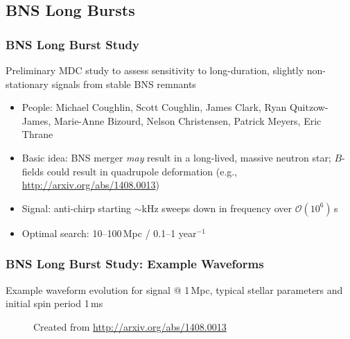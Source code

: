 \documentclass{beamer}
\begin{document}
\subsection{BNS Long Bursts}
\begin{frame}
    \frametitle{BNS Long Burst Study}
    Preliminary MDC study to assess sensitivity to long-duration, slightly
    non-stationary signals from stable BNS remnants
    \begin{itemize}
        \item People: Michael Coughlin, Scott Coughlin, James Clark, Ryan
            Quitzow-James, Marie-Anne Bizourd, Nelson Christensen, Patrick
            Meyers, Eric Thrane
        \item Basic idea: BNS merger \emph{may} result in a long-lived, massive
            neutron star; $B$-fields could result in quadrupole deformation
            (e.g., \url{http://arxiv.org/abs/1408.0013})
        \item Signal: anti-chirp starting $\sim$kHz sweeps down in frequency
            over $\mathcal{O}(10^6)$\,s
        \item Optimal search: 10--100\,Mpc / 0.1--1 year$^{-1}$
    \end{itemize}
\end{frame}

\begin{frame}
    \frametitle{BNS Long Burst Study: Example Waveforms}
    Example waveform evolution for signal @ 1\,Mpc, typical stellar parameters
    and initial spin period 1\,ms

    \begin{figure}
        \centering
        \caption{Created from \url{http://arxiv.org/abs/1408.0013}}
    \end{figure}


\end{frame}
\end{document}
